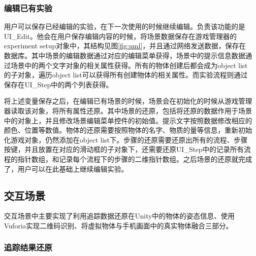 \subsubsection{编辑已有实验}
用户可以保存已经编辑的实验，在下一次使用的时候继续编辑。负责该功能的是UI\_Edit。他会在用户保存编辑内容的时候，将场景数据保存在游戏管理器的experiment setup对象中，其结构见图\ref{fig:uml}，并且通过网络发送数据，保存在数据库。其中场景的编辑数据通过对应的编辑菜单获得，场景中的提示信息数据通过场景中的两个文字对象的相关属性获得。所有的物体创建后都会成为object list的子对象，遍历object list可以获得所有创建物体的相关属性。而实验流程则通过保存在UI\_Step中的两个列表获得。

将上述变量保存之后，在编辑已有场景的时候，场景会在初始化的时候从游戏管理器读取该对象，将所有属性还原。其中场景的还原，包括将还原的数据作用于场景中的对象上，并且修改场景编辑菜单控件的初始值。提示文字按照数据修改相应的颜色、位置等数值。物体的还原需要按照物体的名字、物质的量等信息，重新初始化游戏对象，仍然添加在object list下。步骤的还原需要还原出所有的流程、步骤按键，并且放置在对应的滑动框的子对象下，还需要还原UI\_Step中的记录所有流程的指针数组，和记录每个流程下的步骤的二维指针数组。之后场景的还原就完成了，用户可以在此基础上继续编辑实验。

\subsection{交互场景}
交互场景中主要实现了利用追踪数据还原在Unity中的物体的姿态信息、使用Vuforia实现二维码识别、将虚拟物体与手机画面中的真实物体融合三部分。

\subsubsection{追踪结果还原}


